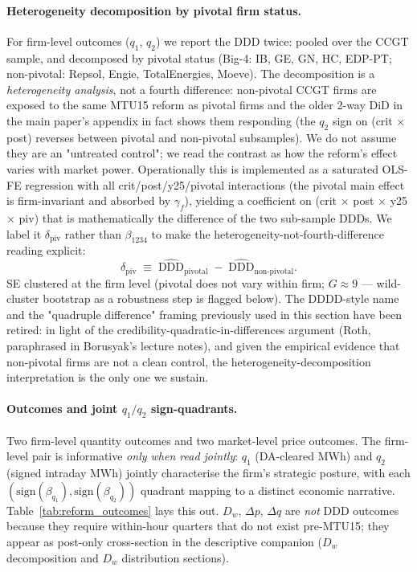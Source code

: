 \documentclass[11pt,a4paper]{article}
\begin{document}
\paragraph{Heterogeneity decomposition by pivotal firm status.}
For firm-level outcomes ($q_1$, $q_2$) we report the DDD twice: pooled over the CCGT sample, and decomposed by pivotal status (Big-4: IB, GE, GN, HC, EDP-PT; non-pivotal: Repsol, Engie, TotalEnergies, Moeve). The decomposition is a \emph{heterogeneity analysis}, not a fourth difference: non-pivotal CCGT firms are exposed to the same MTU15 reform as pivotal firms and the older 2-way DiD in the main paper's appendix in fact shows them responding (the $q_2$ sign on (crit $\times$ post) reverses between pivotal and non-pivotal subsamples). We do not assume they are an "untreated control"; we read the contrast as how the reform's effect varies with market power. Operationally this is implemented as a saturated OLS-FE regression with all crit/post/y25/pivotal interactions (the pivotal main effect is firm-invariant and absorbed by $\gamma_f$), yielding a coefficient on (crit $\times$ post $\times$ y25 $\times$ piv) that is mathematically the difference of the two sub-sample DDDs. We label it $\delta_{\text{piv}}$ rather than $\beta_{1234}$ to make the heterogeneity-not-fourth-difference reading explicit:
\[
  \delta_{\text{piv}} \;\equiv\; \widehat{\text{DDD}}_{\text{pivotal}} \;-\; \widehat{\text{DDD}}_{\text{non-pivotal}}.
\]
SE clustered at the firm level (pivotal does not vary within firm; $G \approx 9$ --- wild-cluster bootstrap as a robustness step is flagged below). The DDDD-style name and the "quadruple difference" framing previously used in this section have been retired: in light of the credibility-quadratic-in-differences argument (Roth, paraphrased in Borusyak's lecture notes), and given the empirical evidence that non-pivotal firms are not a clean control, the heterogeneity-decomposition interpretation is the only one we sustain.

\paragraph{Outcomes and joint $q_1 / q_2$ sign-quadrants.}
Two firm-level quantity outcomes and two market-level price outcomes. The firm-level pair is informative \emph{only when read jointly}: $q_1$ (DA-cleared MWh) and $q_2$ (signed intraday MWh) jointly characterise the firm's strategic posture, with each $(\text{sign}(\beta_{q_1}), \text{sign}(\beta_{q_2}))$ quadrant mapping to a distinct economic narrative. Table~\ref{tab:reform_outcomes} lays this out. $D_w$, $\Delta p$, $\Delta q$ are \emph{not} DDD outcomes because they require within-hour quarters that do not exist pre-MTU15; they appear as post-only cross-section in the descriptive companion ($D_w$ decomposition and $D_w$ distribution sections).
\end{document}
